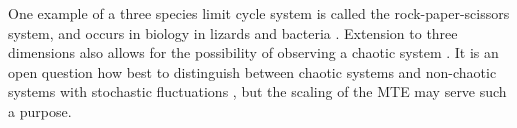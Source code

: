 One example of a three species limit cycle system is called the rock-paper-scissors system, and occurs in biology in lizards and bacteria \cite{Kerr2002,Kirkup2004,Berr2009}. 
%
Extension to three dimensions also allows for the possibility of observing a chaotic system \cite{Strogatz1994}. 
It is an open question how best to distinguish between chaotic systems and non-chaotic systems with stochastic fluctuations \cite{May1999}, but the scaling of the MTE may serve such a purpose. 


